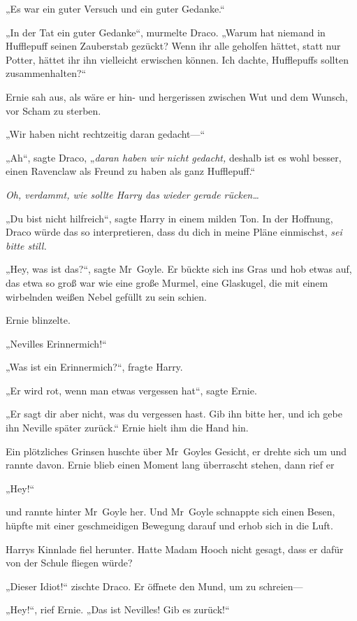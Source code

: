 {„Es war ein guter Versuch und ein guter Gedanke.“

„In der Tat ein guter Gedanke“, murmelte Draco. „Warum hat niemand in Hufflepuff seinen Zauberstab gezückt? Wenn ihr alle geholfen hättet, statt nur Potter, hättet ihr ihn vielleicht erwischen können. Ich dachte, Hufflepuffs sollten zusammenhalten?“

Ernie sah aus, als wäre er hin- und hergerissen zwischen Wut und dem Wunsch, vor Scham zu sterben.

„Wir haben nicht rechtzeitig daran gedacht—“

„Ah“, sagte Draco, „\emph{daran haben wir nicht gedacht,} deshalb ist es wohl besser, einen Ravenclaw als Freund zu haben als ganz Hufflepuff.“

\emph{Oh, verdammt, wie sollte Harry das wieder gerade rücken…}

„Du bist nicht hilfreich“, sagte Harry in einem milden Ton. In der Hoffnung, Draco würde das so interpretieren, dass du dich in meine Pläne einmischst, \emph{sei bitte still.}

„Hey, was ist das?“, sagte Mr~Goyle. Er bückte sich ins Gras und hob etwas auf, das etwa so groß war wie eine große Murmel, eine Glaskugel, die mit einem wirbelnden weißen Nebel gefüllt zu sein schien.

Ernie blinzelte.

„Nevilles Erinnermich!“

„Was ist ein Erinnermich?“, fragte Harry.

„Er wird rot, wenn man etwas vergessen hat“, sagte Ernie.

„Er sagt dir aber nicht, was du vergessen hast. Gib ihn bitte her, und ich gebe ihn Neville später zurück.“ Ernie hielt ihm die Hand hin.

Ein plötzliches Grinsen huschte über Mr~Goyles Gesicht, er drehte sich um und rannte davon. Ernie blieb einen Moment lang überrascht stehen, dann rief er

„Hey!“

und rannte hinter Mr~Goyle her. Und Mr~Goyle schnappte sich einen Besen, hüpfte mit einer geschmeidigen Bewegung darauf und erhob sich in die Luft.

Harrys Kinnlade fiel herunter. Hatte Madam Hooch nicht gesagt, dass er dafür von der Schule fliegen würde?

„Dieser Idiot!“ zischte Draco. Er öffnete den Mund, um zu schreien—

„Hey!“, rief Ernie. „Das ist Nevilles! Gib es zurück!“

}

